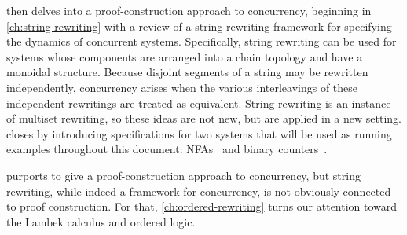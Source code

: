  then delves into a proof-construction approach to concurrency, beginning in \cref{ch:string-rewriting} with a review of a string rewriting framework for specifying the dynamics of concurrent systems.
Specifically, string rewriting can be used for systems whose components are arranged into a chain topology and have a monoidal structure.
Because 
disjoint segments of a string may be rewritten independently,
concurrency arises when the various interleavings of these independent rewritings are treated as equivalent.
String rewriting is an instance of multiset rewriting, so these ideas are not new, but are applied in a new setting.\autocite{Meseguer:TCS92}
 closes by introducing
specifications for two systems that will be used as running examples throughout this document: \aclp*{NFA}~ and binary counters~.

 purports to give a proof-construction approach to concurrency, but string rewriting, while indeed a framework for concurrency, is not obviously connected to proof construction.
For that, \cref{ch:ordered-rewriting} turns our attention toward the Lambek calculus and ordered logic.

